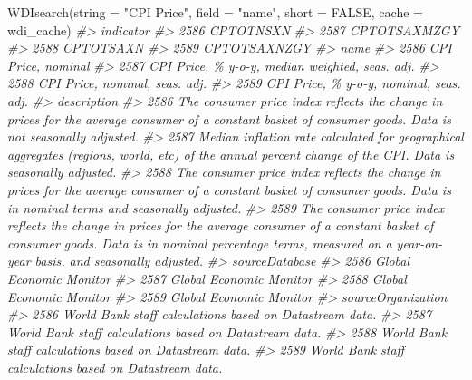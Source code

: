\documentclass[
]{bxjsbook}
\newenvironment{Shaded}{\begin{snugshade}}{\end{snugshade}}
\newcommand{\AttributeTok}[1]{\textcolor[rgb]{0.77,0.63,0.00}{#1}}
\newcommand{\CommentTok}[1]{\textcolor[rgb]{0.56,0.35,0.01}{\textit{#1}}}
\newcommand{\ConstantTok}[1]{\textcolor[rgb]{0.00,0.00,0.00}{#1}}
\newcommand{\FunctionTok}[1]{\textcolor[rgb]{0.00,0.00,0.00}{#1}}
\newcommand{\NormalTok}[1]{#1}
\newcommand{\StringTok}[1]{\textcolor[rgb]{0.31,0.60,0.02}{#1}}
\theoremstyle{definition}
\theoremstyle{definition}
\theoremstyle{definition}
\theoremstyle{definition}
\theoremstyle{remark}
\begin{document}
\begin{Shaded}
\begin{Highlighting}[]
\FunctionTok{WDIsearch}\NormalTok{(}\AttributeTok{string =} \StringTok{"CPI Price"}\NormalTok{, }\AttributeTok{field =} \StringTok{"name"}\NormalTok{, }\AttributeTok{short =} \ConstantTok{FALSE}\NormalTok{, }\AttributeTok{cache =}\NormalTok{ wdi\_cache)}
\CommentTok{\#\textgreater{}         indicator}
\CommentTok{\#\textgreater{} 2586    CPTOTNSXN}
\CommentTok{\#\textgreater{} 2587 CPTOTSAXMZGY}
\CommentTok{\#\textgreater{} 2588    CPTOTSAXN}
\CommentTok{\#\textgreater{} 2589 CPTOTSAXNZGY}
\CommentTok{\#\textgreater{}                                                 name}
\CommentTok{\#\textgreater{} 2586                              CPI Price, nominal}
\CommentTok{\#\textgreater{} 2587 CPI Price, \% y{-}o{-}y, median weighted, seas. adj.}
\CommentTok{\#\textgreater{} 2588                  CPI Price, nominal, seas. adj.}
\CommentTok{\#\textgreater{} 2589         CPI Price, \% y{-}o{-}y, nominal, seas. adj.}
\CommentTok{\#\textgreater{}                                                                                                                                                                                                                  description}
\CommentTok{\#\textgreater{} 2586                                                                The consumer price index reflects the change in prices for the average consumer of a constant basket of consumer goods. Data is not seasonally adjusted.}
\CommentTok{\#\textgreater{} 2587                                                                Median inflation rate calculated for geographical aggregates (regions, world, etc) of the annual percent change of the CPI. Data is seasonally adjusted.}
\CommentTok{\#\textgreater{} 2588                                               The consumer price index reflects the change in prices for the average consumer of a constant basket of consumer goods. Data is in nominal terms and seasonally adjusted.}
\CommentTok{\#\textgreater{} 2589 The consumer price index reflects the change in prices for the average consumer of a constant basket of consumer goods. Data is in nominal percentage terms, measured on a year{-}on{-}year basis, and seasonally adjusted.}
\CommentTok{\#\textgreater{}               sourceDatabase}
\CommentTok{\#\textgreater{} 2586 Global Economic Monitor}
\CommentTok{\#\textgreater{} 2587 Global Economic Monitor}
\CommentTok{\#\textgreater{} 2588 Global Economic Monitor}
\CommentTok{\#\textgreater{} 2589 Global Economic Monitor}
\CommentTok{\#\textgreater{}                                           sourceOrganization}
\CommentTok{\#\textgreater{} 2586 World Bank staff calculations based on Datastream data.}
\CommentTok{\#\textgreater{} 2587 World Bank staff calculations based on Datastream data.}
\CommentTok{\#\textgreater{} 2588 World Bank staff calculations based on Datastream data.}
\CommentTok{\#\textgreater{} 2589 World Bank staff calculations based on Datastream data.}
\end{Highlighting}
\end{Shaded}
\end{document}
